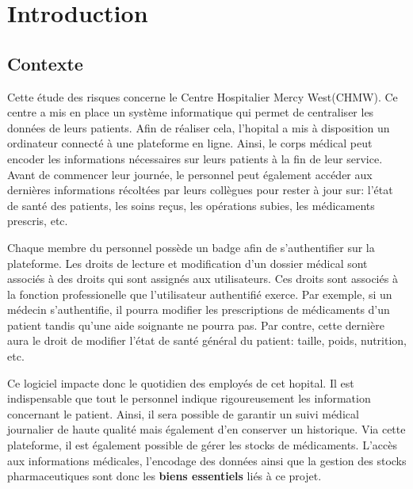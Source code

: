 \documentclass[12pt]{article}
\begin{document}
\newpage
\renewcommand{\contentsname}{Table des matières}
\tableofcontents
\newpage

\section{Introduction} 

\subsection{Contexte}

\justify
Cette étude des risques concerne le Centre Hospitalier Mercy West(CHMW). Ce centre a mis en place un système informatique qui permet de centraliser les données de leurs patients. Afin de réaliser cela, l'hopital a mis à disposition un ordinateur connecté à une plateforme en ligne. Ainsi, le corps médical peut encoder les informations nécessaires sur leurs patients à la fin de leur service. Avant de commencer leur journée, le personnel peut également accéder aux dernières informations récoltées par leurs collègues pour rester à jour sur: l'état de santé des patients, les soins reçus, les opérations subies, les médicaments prescris, etc.

\justify
Chaque membre du personnel possède un badge afin de s'authentifier sur la plateforme. Les droits de lecture et modification d'un dossier médical sont associés à des droits qui sont assignés aux utilisateurs.  Ces droits sont associés à la fonction professionelle que l'utilisateur authentifié exerce. Par exemple, si un médecin s'authentifie, il pourra modifier les prescriptions de médicaments d'un patient tandis qu'une aide soignante ne pourra pas. Par contre, cette dernière aura le droit de modifier l'état de santé général du patient: taille, poids, nutrition, etc.

\justify
Ce logiciel impacte donc le quotidien des employés de cet hopital. Il est indispensable que tout le personnel indique rigoureusement les information concernant le patient. Ainsi, il sera possible de garantir un suivi médical journalier de haute qualité mais également d'en conserver un historique. Via cette plateforme, il est également possible de gérer les stocks de médicaments. L'accès aux informations médicales, l'encodage des données ainsi que la gestion des stocks pharmaceutiques sont donc les \textbf{biens essentiels} liés à ce projet. 
\end{document}
